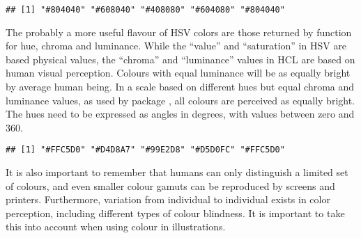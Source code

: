 \documentclass[krantz2]{krantz}\usepackage{knitr}%
\begin{document}
\begin{knitrout}\footnotesize
{}\color{fgcolor}\begin{kframe}
\begin{alltt}
\hlstd{(}\hlstd{(}\hlstd{,}\hlstd{,}\hlstd{,}\hlstd{,}\hlstd{),} \hlstd{,} \hlstd{)}
\end{alltt}
\begin{verbatim}
## [1] "#804040" "#608040" "#408080" "#604080" "#804040"
\end{verbatim}
\end{kframe}
\end{knitrout}

The probably a more useful flavour of HSV colors are those returned by function  for hue, chroma and luminance. While the ``value'' and ``saturation'' in HSV are based physical values, the ``chroma'' and ``luminance'' values in HCL are based on human visual perception. Colours with equal luminance will be as equally bright by average human being. In a scale based on different hues but equal chroma and luminance values, as used by package \ggplot, all colours are perceived as equally bright. The hues need to be expressed as angles in degrees, with values between zero and 360.

\begin{knitrout}\footnotesize
{}\color{fgcolor}\begin{kframe}
\begin{alltt}
\hlstd{(}\hlstd{(}\hlstd{,}\hlstd{,}\hlstd{,}\hlstd{,}\hlstd{)} \hlopt{*} \hlstd{)}
\end{alltt}
\begin{verbatim}
## [1] "#FFC5D0" "#D4D8A7" "#99E2D8" "#D5D0FC" "#FFC5D0"
\end{verbatim}
\end{kframe}
\end{knitrout}

It is also important to remember that humans can only distinguish a limited set of colours, and even smaller colour gamuts can be reproduced by screens and printers. Furthermore, variation from individual to individual exists in color perception, including different types of colour blindness. It is important to take this into account when using colour in illustrations.
\end{document}
